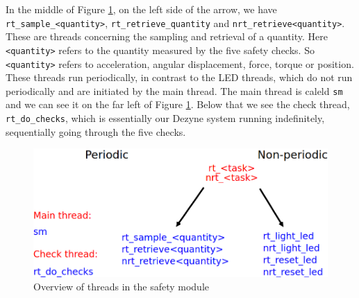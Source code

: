 \documentclass[12pt]{scrreprt}
\begin{document}
\par
In the middle of Figure \ref{fig:threads_overview}, on the left side of the arrow, we have \texttt{rt\_sample\_<quantity>}, \texttt{rt\_retrieve\_quantity} and \texttt{nrt\_retrieve<quantity>}. These are threads concerning the sampling and retrieval of a quantity. Here \texttt{<quantity>} refers to the quantity measured by the five safety checks. So \texttt{<quantity>} refers to acceleration, angular displacement, force, torque or position. These threads run periodically, in contrast to the LED threads, which do not run periodically and are initiated by the main thread. The main thread is caleld \texttt{sm} and we can see it on the far left of Figure \ref{fig:threads_overview}. Below that we see the check thread, \texttt{rt\_do\_checks}, which is essentially our Dezyne system running indefinitely, sequentially going through the five checks.

\begin{figure}[H]
    \centering
    \includegraphics[width=\textwidth]{Figures/results/modelling_figures/Threading/threads_overview.png}
    \caption{Overview of threads in the safety module}
    \label{fig:threads_overview}
\end{figure}
\end{document}
